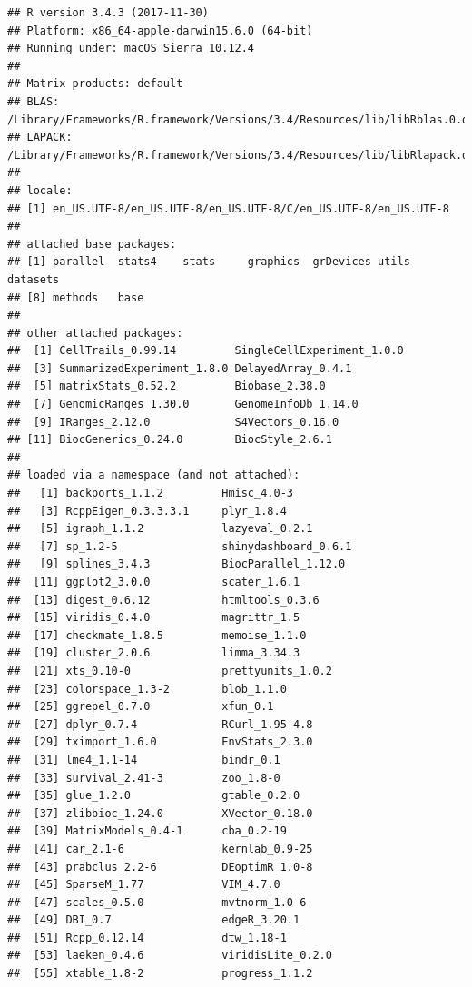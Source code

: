 \documentclass[]{book}
\theoremstyle{definition}
\theoremstyle{definition}
\theoremstyle{definition}
\theoremstyle{remark}
\begin{document}
\begin{verbatim}
## R version 3.4.3 (2017-11-30)
## Platform: x86_64-apple-darwin15.6.0 (64-bit)
## Running under: macOS Sierra 10.12.4
## 
## Matrix products: default
## BLAS: /Library/Frameworks/R.framework/Versions/3.4/Resources/lib/libRblas.0.dylib
## LAPACK: /Library/Frameworks/R.framework/Versions/3.4/Resources/lib/libRlapack.dylib
## 
## locale:
## [1] en_US.UTF-8/en_US.UTF-8/en_US.UTF-8/C/en_US.UTF-8/en_US.UTF-8
## 
## attached base packages:
## [1] parallel  stats4    stats     graphics  grDevices utils     datasets 
## [8] methods   base     
## 
## other attached packages:
##  [1] CellTrails_0.99.14         SingleCellExperiment_1.0.0
##  [3] SummarizedExperiment_1.8.0 DelayedArray_0.4.1        
##  [5] matrixStats_0.52.2         Biobase_2.38.0            
##  [7] GenomicRanges_1.30.0       GenomeInfoDb_1.14.0       
##  [9] IRanges_2.12.0             S4Vectors_0.16.0          
## [11] BiocGenerics_0.24.0        BiocStyle_2.6.1           
## 
## loaded via a namespace (and not attached):
##   [1] backports_1.1.2         Hmisc_4.0-3            
##   [3] RcppEigen_0.3.3.3.1     plyr_1.8.4             
##   [5] igraph_1.1.2            lazyeval_0.2.1         
##   [7] sp_1.2-5                shinydashboard_0.6.1   
##   [9] splines_3.4.3           BiocParallel_1.12.0    
##  [11] ggplot2_3.0.0           scater_1.6.1           
##  [13] digest_0.6.12           htmltools_0.3.6        
##  [15] viridis_0.4.0           magrittr_1.5           
##  [17] checkmate_1.8.5         memoise_1.1.0          
##  [19] cluster_2.0.6           limma_3.34.3           
##  [21] xts_0.10-0              prettyunits_1.0.2      
##  [23] colorspace_1.3-2        blob_1.1.0             
##  [25] ggrepel_0.7.0           xfun_0.1               
##  [27] dplyr_0.7.4             RCurl_1.95-4.8         
##  [29] tximport_1.6.0          EnvStats_2.3.0         
##  [31] lme4_1.1-14             bindr_0.1              
##  [33] survival_2.41-3         zoo_1.8-0              
##  [35] glue_1.2.0              gtable_0.2.0           
##  [37] zlibbioc_1.24.0         XVector_0.18.0         
##  [39] MatrixModels_0.4-1      cba_0.2-19             
##  [41] car_2.1-6               kernlab_0.9-25         
##  [43] prabclus_2.2-6          DEoptimR_1.0-8         
##  [45] SparseM_1.77            VIM_4.7.0              
##  [47] scales_0.5.0            mvtnorm_1.0-6          
##  [49] DBI_0.7                 edgeR_3.20.1           
##  [51] Rcpp_0.12.14            dtw_1.18-1             
##  [53] laeken_0.4.6            viridisLite_0.2.0      
##  [55] xtable_1.8-2            progress_1.1.2         

\end{verbatim}
\end{document}
